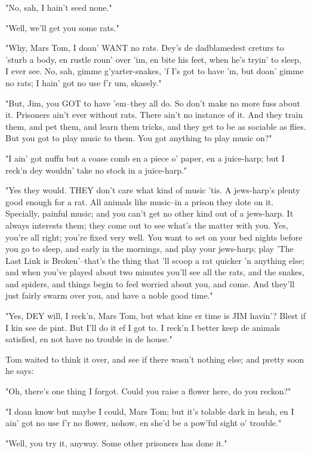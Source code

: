 "No, sah, I hain't seed none."

"Well, we'll get you some rats."

"Why, Mars Tom, I doan' WANT no rats.  Dey's de dadblamedest creturs to
'sturb a body, en rustle roun' over 'im, en bite his feet, when he's
tryin' to sleep, I ever see.  No, sah, gimme g'yarter-snakes, 'f I's got
to have 'm, but doan' gimme no rats; I hain' got no use f'r um, skasely."

"But, Jim, you GOT to have 'em--they all do.  So don't make no more fuss
about it.  Prisoners ain't ever without rats.  There ain't no instance of
it.  And they train them, and pet them, and learn them tricks, and they
get to be as sociable as flies.  But you got to play music to them.  You
got anything to play music on?"

"I ain' got nuffn but a coase comb en a piece o' paper, en a juice-harp;
but I reck'n dey wouldn' take no stock in a juice-harp."

"Yes they would.  THEY don't care what kind of music 'tis.  A jews-harp's
plenty good enough for a rat.  All animals like music--in a prison they
dote on it.  Specially, painful music; and you can't get no other kind
out of a jews-harp.  It always interests them; they come out to see
what's the matter with you.  Yes, you're all right; you're fixed very
well.  You want to set on your bed nights before you go to sleep, and
early in the mornings, and play your jews-harp; play 'The Last Link is
Broken'--that's the thing that 'll scoop a rat quicker 'n anything else;
and when you've played about two minutes you'll see all the rats, and the
snakes, and spiders, and things begin to feel worried about you, and
come.  And they'll just fairly swarm over you, and have a noble good
time."

"Yes, DEY will, I reck'n, Mars Tom, but what kine er time is JIM havin'?
Blest if I kin see de pint.  But I'll do it ef I got to.  I reck'n I
better keep de animals satisfied, en not have no trouble in de house."

Tom waited to think it over, and see if there wasn't nothing else; and
pretty soon he says:

"Oh, there's one thing I forgot.  Could you raise a flower here, do you
reckon?"

"I doan know but maybe I could, Mars Tom; but it's tolable dark in heah,
en I ain' got no use f'r no flower, nohow, en she'd be a pow'ful sight o'
trouble."

"Well, you try it, anyway.  Some other prisoners has done it."

